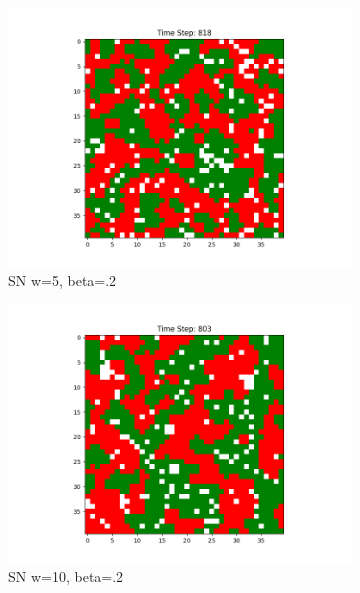 \documentclass[11pt]{article}
\begin{document}
\begin{figure}[h]
\begin{subfigure}{0.14\textwidth}
			\includegraphics[width=\linewidth]{final_cluster_w5b20.png}
			\caption{\centering SN w=5, beta=.2}
		\end{subfigure}\hfill
		\begin{subfigure}{0.14\textwidth}
			\includegraphics[width=\linewidth]{final_cluster_w10b20.png}
			\caption{\centering SN w=10, beta=.2}
		\end{subfigure}\hfill
		\begin{subfigure}{0.14\textwidth}

\end{subfigure}
\end{figure}
\end{document}
